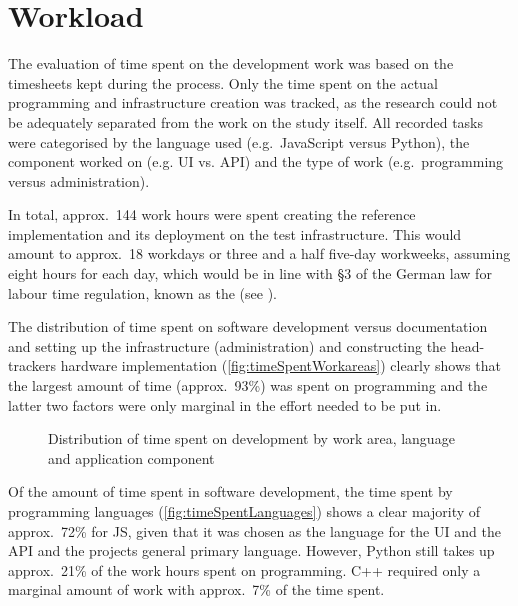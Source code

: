 \section{Workload}\label{sec:workload-evaluation}

The evaluation of time spent on the development work was based on the timesheets kept during the process.
Only the time spent on the actual programming and infrastructure creation was tracked, as the research could not be adequately separated from the work on the study itself.
All recorded tasks were categorised by the language used (e.g.\ JavaScript versus Python), the component worked on (e.g. \ac{UI} vs. \ac{API}) and the type of work (e.g.\ programming versus administration).

In total, approx.~144 work hours were spent creating the reference implementation and its deployment on the test infrastructure.
This would amount to approx.~18 workdays or three and a half five-day workweeks, assuming eight hours for each day, which would be in line with §3 of the German law for labour time regulation, known as the  (see \parencite{abzgPar3}).

The distribution of time spent on software development versus documentation and setting up the infrastructure (administration) and constructing the head-tracker\textquotesingle s hardware implementation (\autoref{fig:timeSpentWorkareas}) clearly shows that the largest amount of time (approx.~93\%) was spent on programming and the latter two factors were only marginal in the effort needed to be put in.

\begin{figure*}[!ht]
\centering

\caption[Distribution of time spent on development]{Distribution of time spent on development by work area, language and application component\protect}
\label{fig:timeSpentWorkareas}
\end{figure*}

Of the amount of time spent in software development, the time spent by programming languages (\autoref{fig:timeSpentLanguages}) shows a clear majority of approx.~72\% for \ac{JS}, given that it was chosen as the language for the \ac{UI} and the \ac{API} and the project\textquotesingle s general primary language.
However, Python still takes up approx.~21\% of the work hours spent on programming.
C++ required only a marginal amount of work with approx.~7\% of the time spent.

